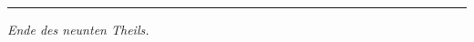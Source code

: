 \documentclass[12pt,a4paper]{article}
\begin{document}
\newpage

\vspace{2em}

\begin{center}
\rule{0.8\textwidth}{0.4pt}
\end{center}

\vspace{1em}

\textit{Ende des neunten Theils.}
\end{document}
